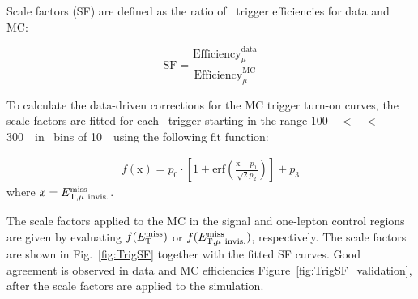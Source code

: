 \par Scale factors (SF) are defined as the ratio of \MET~trigger efficiencies for data and MC:

\begin{equation}
    \label{eq:dataMCsf}
    \text{SF} = \frac{\text{Efficiency}^{\text{data}}_{\mu}}{\text{Efficiency}^{\text{MC}}_{\mu}}
\end{equation}

To calculate the data-driven corrections for the MC trigger turn-on curves, the scale factors are fitted for each \MET~trigger starting in the range 100~\GeV~$<$ \METnomu~$<$ 300~\GeV~in \MET~bins of 10~\GeV~using the following fit function:

\begin{eqnarray}
    \label{eq:dataMCsf_fit}
    f\left(\text{x}\right) = p_0 \cdot \left[1 + \text{erf}\left(\frac{\text{x} - p_{1}}{\sqrt{2}p_{2}}\right)\right] + p_3
\end{eqnarray}
where $x = E_{\mathrm{T, \mu~invis.}}^{\mathrm{miss}}$.

\par The scale factors applied to the MC in the signal and one-lepton control regions are given by evaluating $f(E_{\mathrm{T}}^{\mathrm{miss}})$ or $f(E_{\mathrm{T, \mu~invis.}}^{\mathrm{miss}})$, respectively. 
The scale factors are shown in Fig.~\ref{fig:TrigSF} together with the fitted SF curves.
Good agreement is observed in data and MC efficiencies Figure~\ref{fig:TrigSF_validation}, after the scale factors are applied to the simulation.

